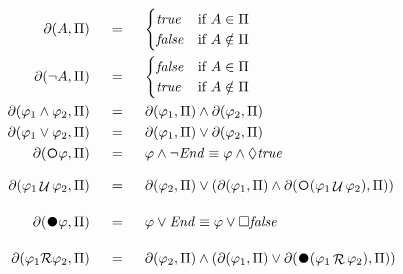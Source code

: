 \begin{align}
\begin{aligned}
\Dfun{A} 			\ind &= \ind 
\begin{cases}
\true 	& \text{if}\ A \in \PropInt\\
\false  & \text{if}\ A \notin \PropInt\\
\end{cases}\\
\Dfun{\lnot A} 			\ind &= \ind 
\begin{cases}
\false 	& \text{if}\ A \in \PropInt\\
\true   & \text{if}\ A \notin \PropInt\\
\end{cases}\\
\Dfun{\varphi_1 \lAND \varphi_2} 			\ind &= \ind   \Dfun{\varphi_1} \lAND \Dfun{\varphi_2}\\
\Dfun{\varphi_1 \lOR  \varphi_2} 			\ind &= \ind   \Dfun{\varphi_1} \lOR \Dfun{\varphi_2}\\
\Dfun{\Next \varphi} 	\ind &= \ind   \varphi \lAND \lnot \Ended \equiv \varphi \lAND \Diamond \true\\
\Dfun{\varphi_1 \lUntil \varphi_2} 	\ind &= \ind   \Dfun{\varphi_2} \lOR (\Dfun{\varphi_1} \lAND\Dfun{\Next(\varphi_1 \lUntil \varphi_2)})\\
\Dfun{\Wnext \varphi} 	\ind &= \ind   \varphi \lOR \Ended \equiv \varphi \lOR \Box \false\\
\Dfun{\varphi_1 \R \varphi_2} 	\ind &= \ind   \Dfun{\varphi_2} \lAND (\Dfun{\varphi_1} \lOR \Dfun{\Wnext(\varphi_1 \Release \varphi_2)})\\
\label{delta-ltlf}
\end{aligned}		
\end{align}
